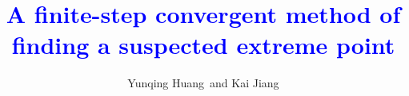 \documentclass[mathpazo]{csam}
\theoremstyle{remark}
\begin{document}
	\title[HiCS]{\textcolor{blue}{A finite-step convergent method 
	of finding a suspected extreme point}}

	
	\author[Y. Huang and K. Jiang]{
	Yunqing Huang\corrauth~and Kai Jiang }
	\address
	{ \ School of Mathematics and Computational Science, 
		Hunan Key Laboratory for Computation and Simulation in Science and Engineering,
		Xiangtan University, Xiangtan, Hunan, 411105, China.}
	
\end{document}

